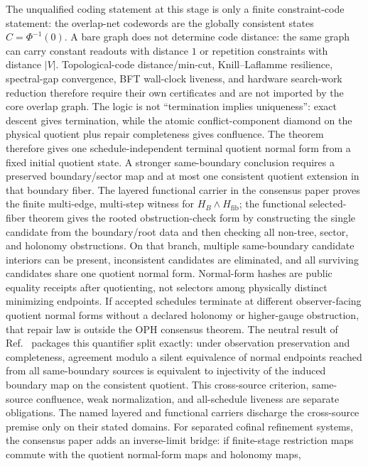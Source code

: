 The unqualified coding statement at this stage is only a finite constraint-code statement:
the overlap-net codewords are the globally consistent states \(C=\Phi^{-1}(0)\). A bare graph does
not determine code distance: the same graph can carry constant readouts with distance \(1\) or
repetition constraints with distance \(|V|\). Topological-code distance/min-cut, Knill--Laflamme
resilience, spectral-gap convergence, BFT wall-clock liveness, and hardware search-work reduction
therefore require their own certificates and are not imported by the core overlap graph.
The logic is not ``termination implies uniqueness'': exact descent gives termination, while the
atomic conflict-component diamond on the physical quotient plus repair completeness gives
confluence. The theorem therefore gives one schedule-independent terminal quotient normal form
from a fixed initial quotient state. A stronger same-boundary conclusion requires a preserved
boundary/sector map and at most one consistent quotient extension in that boundary fiber. The
layered functional carrier in the consensus paper proves the finite multi-edge, multi-step witness
for \(H_B\wedge H_{\mathrm{fib}}\); the functional selected-fiber theorem gives the rooted
obstruction-check form by constructing the single candidate from the boundary/root data and then
checking all non-tree, sector, and holonomy obstructions. On that branch, multiple same-boundary
candidate interiors can be present, inconsistent candidates are eliminated, and all surviving
candidates share one quotient normal form. Normal-form hashes are public equality receipts after quotienting, not
selectors among physically distinct minimizing endpoints. If accepted schedules terminate at
different observer-facing quotient normal forms without a declared holonomy or higher-gauge
obstruction, that repair law is outside the OPH consensus theorem.
The neutral result of Ref.~\cite{observableNormalForms} packages this quantifier split exactly:
under observation preservation and completeness, agreement modulo a silent equivalence of normal
endpoints reached from all same-boundary sources is equivalent to injectivity of the induced
boundary map on the consistent quotient.  This cross-source criterion, same-source confluence,
weak normalization, and all-schedule liveness are separate obligations.  The named layered and
functional carriers discharge the cross-source premise only on their stated domains.
For separated cofinal refinement systems, the consensus paper adds an inverse-limit bridge:
if finite-stage restriction maps commute with the quotient normal-form maps and holonomy maps,
